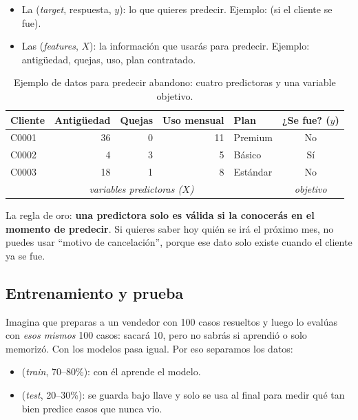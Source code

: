 \begin{itemize}
  \item La  (\emph{target}, respuesta, $y$): lo que
        quieres predecir. Ejemplo:  (si el cliente se fue).
  \item Las  (\emph{features}, $X$): la
        información que usarás para predecir. Ejemplo: antigüedad, quejas,
        uso, plan contratado.
\end{itemize}

\begin{table}[H]
\centering
\small
\caption{Ejemplo de datos para predecir abandono: cuatro predictoras y una
variable objetivo.}
\label{tab:m7-xy}
\begin{tabular}{lrrrlc}
\toprule
\textbf{Cliente} & \textbf{Antigüedad} & \textbf{Quejas} & \textbf{Uso mensual}
  & \textbf{Plan} & \textbf{¿Se fue? ($y$)} \\
\midrule
C0001 & 36 & 0 & 11 & Premium  & No \\
C0002 & 4  & 3 & 5  & Básico   & Sí \\
C0003 & 18 & 1 & 8  & Estándar & No \\
\multicolumn{5}{c}{\emph{variables predictoras ($X$)}} & \emph{objetivo} \\
\bottomrule
\end{tabular}
\end{table}

La regla de oro: \textbf{una predictora solo es válida si la conocerás en el
momento de predecir}. Si quieres saber hoy quién se irá el próximo mes, no
puedes usar ``motivo de cancelación'', porque ese dato solo existe cuando el
cliente ya se fue.

\subsection{Entrenamiento y prueba}
\label{sec:m7-split}

Imagina que preparas a un vendedor con 100 casos resueltos y luego lo evalúas
con \emph{esos mismos} 100 casos: sacará 10, pero no sabrás si aprendió o solo
memorizó. Con los modelos pasa igual. Por eso separamos los datos:

\begin{itemize}
  \item {} (\emph{train}, 70--80\%): con él
        aprende el modelo.
  \item {} (\emph{test}, 20--30\%): se guarda bajo
        llave y solo se usa al final para medir qué tan bien predice casos que
        nunca vio.
\end{itemize}

